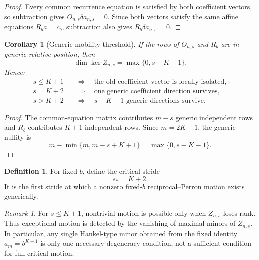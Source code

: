 \documentclass[11pt]{amsart}
\numberwithin{equation}{section}
\theoremstyle{plain}
\newtheorem{corollary}[theorem]{Corollary}
\theoremstyle{definition}
\newtheorem{definition}[theorem]{Definition}
\theoremstyle{remark}
\newtheorem{remark}[theorem]{Remark}
\begin{document}
\begin{proof}
Every common recurrence equation is satisfied by both coefficient vectors, so subtraction gives $O_{n,s}\delta a_{n,s}=0$.  Since both vectors satisfy the same affine equations $R_ba=c_b$, subtraction also gives $R_b\delta a_{n,s}=0$.
\end{proof}

\begin{corollary}[Generic mobility threshold]
\label{cor:generic_mobility_threshold}
If the rows of $O_{n,s}$ and $R_b$ are in generic relative position, then
\begin{equation}
\dim\ker Z_{n,s}
=
\max\{0,s-K-1\}.
\label{eq:generic_mobility_dimension}
\end{equation}
Hence:
\begin{align}
s\leq K+1
&\quad\Longrightarrow\quad
\text{the old coefficient vector is locally isolated},
\label{eq:rigid_stride_small}\\
s=K+2
&\quad\Longrightarrow\quad
\text{one generic coefficient direction survives},
\label{eq:critical_stride_one_direction}\\
s>K+2
&\quad\Longrightarrow\quad
s-K-1\text{ generic directions survive}.
\label{eq:large_stride_directions}
\end{align}
\end{corollary}

\begin{proof}
The common-equation matrix contributes $m-s$ generic independent rows and $R_b$ contributes $K+1$ independent rows.  Since $m=2K+1$, the generic nullity is
\begin{equation}
m-\min\{m,m-s+K+1\}
=\max\{0,s-K-1\}.
\end{equation}
\end{proof}

\begin{definition}
\label{def:critical_stride}
For fixed $b$, define the critical stride
\begin{equation}
s_*=K+2.
\label{eq:critical_stride}
\end{equation}
It is the first stride at which a nonzero fixed-$b$ reciprocal--Perron motion exists generically.
\end{definition}

\begin{remark}
\label{rem:small_stride_degeneracy}
For $s\leq K+1$, nontrivial motion is possible only when $Z_{n,s}$ loses rank.  Thus exceptional motion is detected by the vanishing of maximal minors of $Z_{n,s}$.  In particular, any single Hankel-type minor obtained from the fixed identity $a_m=b^{K+1}$ is only one necessary degeneracy condition, not a sufficient condition for full critical motion.
\end{remark}
\end{document}

